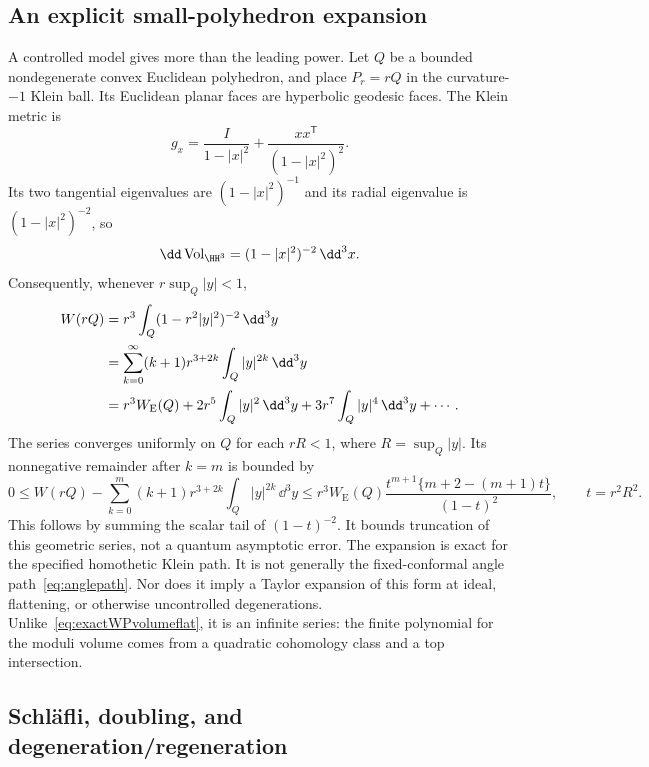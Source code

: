 \subsection{An explicit small-polyhedron expansion}

A controlled model gives more than the leading power. Let $Q$ be a
bounded nondegenerate convex Euclidean polyhedron, and place $P_r=rQ$ in
the curvature-$-1$ Klein ball. Its Euclidean planar faces are
hyperbolic geodesic faces. The Klein metric is
\[
 g_x=\frac{I}{1-|x|^2}
       +\frac{xx^{\mathsf T}}{(1-|x|^2)^2}.
\]
Its two tangential eigenvalues are $(1-|x|^2)^{-1}$ and its
radial eigenvalue is $(1-|x|^2)^{-2}$, so
\[
 \dd\operatorname{Vol}_{\HH^3}=(1-|x|^2)^{-2}\,\dd^3x.
\]
Consequently, whenever $r\sup_Q|y|<1$,
\begin{align}
 W(rQ)
 &=r^3\int_Q(1-r^2|y|^2)^{-2}\,\dd^3y\notag\\
 &=\sum_{k=0}^{\infty}(k+1)r^{3+2k}
                         \int_Q|y|^{2k}\,\dd^3y\notag\\
 &=r^3 W_{\mathrm E}(Q)
      +2r^5\int_Q|y|^2\,\dd^3y
      +3r^7\int_Q|y|^4\,\dd^3y+\cdots.
 \label{eq:Kleinvolumeexpansion}
\end{align}
The series converges uniformly on $Q$ for each
$rR<1$, where $R=\sup_Q|y|$. Its nonnegative remainder after
$k=m$ is bounded by
\[
 0\le W(rQ)-\sum_{k=0}^m(k+1)r^{3+2k}
                 \int_Q|y|^{2k}\,\dd^3y
 \le r^3W_{\mathrm E}(Q)
 \frac{t^{m+1}\{m+2-(m+1)t\}}{(1-t)^2},\qquad t=r^2R^2.
\]
This follows by summing the scalar tail of $(1-t)^{-2}$.
It bounds truncation of this geometric series, not a quantum
asymptotic error. The expansion is exact for the specified
homothetic Klein path. It is not generally the fixed-conformal
angle path~\eqref{eq:anglepath}. Nor does it imply a Taylor expansion
of this form at ideal, flattening, or otherwise uncontrolled
degenerations. Unlike~\eqref{eq:exactWPvolumeflat}, it is an infinite
series: the finite polynomial for the moduli volume comes from a
quadratic cohomology class and a top intersection.

\subsection{Schl\"afli, doubling, and degeneration/regeneration}

